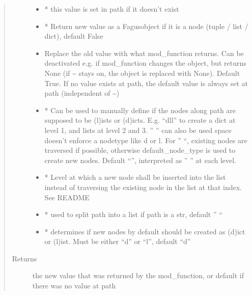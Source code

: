\documentclass[a4paper,10pt,english]{sphinxmanual}
\begin{document}
\begin{fulllineitems}
\begin{fulllineitems}
\begin{quote}
\begin{description}
\begin{itemize}
\item {}
\sphinxAtStartPar
{} \textendash{} * this value is set in path if it doesn’t exist

\item {}
\sphinxAtStartPar
{} \textendash{} * Return new value as a Fagus\sphinxhyphen{}object if it is a node (tuple / list / dict), default False

\item {}
\sphinxAtStartPar
{} \textendash{} Replace the old value with what mod\_function returns. Can be deactivated e.g. if mod\_function
changes the object, but returns None (if \textasciitilde{} stays on, the object is replaced with None). Default True.
If no value exists at path, the default value is always set at path (independent of \textasciitilde{})

\item {}
\sphinxAtStartPar
{} \textendash{} * Can be used to manually define if the nodes along path are supposed to be (l)ists or
(d)icts. E.g. “dll” to create a dict at level 1, and lists at level 2 and 3. ” ” can also be used \sphinxhyphen{}
space doesn’t enforce a node\sphinxhyphen{}type like d or l. For ” “, existing nodes are traversed if possible,
otherwise default\_node\_type is used to create new nodes. Default “”, interpreted as ” ” at each level.

\item {}
\sphinxAtStartPar
{} \textendash{} * Level at which a new node shall be inserted into the list instead of traversing the
existing node in the list at that index. See README

\item {}
\sphinxAtStartPar
{} \textendash{} * used to split path into a list if path is a str, default ” “

\item {}
\sphinxAtStartPar
{} \textendash{} * determines if new nodes by default should be created as (d)ict or (l)ist. Must be
either “d” or “l”, default “d”

\end{itemize}

\item[{Returns}] \leavevmode
\sphinxAtStartPar
the new value that was returned by the mod\_function, or default if there was no value at path


\end{description}
\end{quote}
\end{fulllineitems}
\end{fulllineitems}
\end{document}
